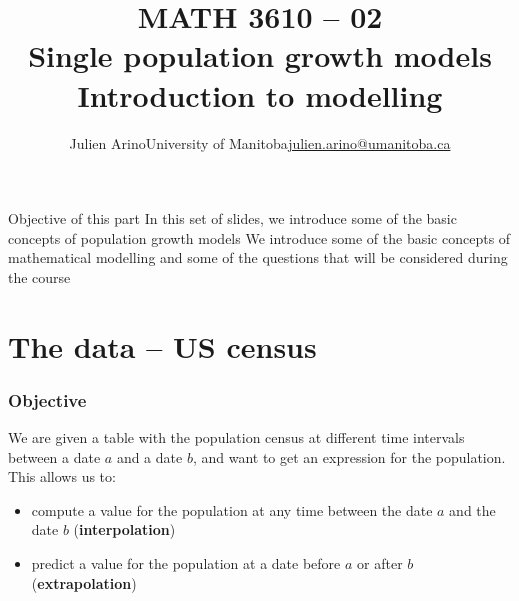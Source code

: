 \documentclass[aspectratio=169]{beamer}
\title[Single population growth]{MATH 3610 -- 02\\ Single population growth models\\Introduction to modelling}
\author{\texorpdfstring{Julien Arino\newline University of Manitoba\newline\url{julien.arino@umanitoba.ca}}{Julien Arino}}
\date{}
\begin{document}





\begin{frame}{Objective of this part}
In this set of slides, we introduce some of the basic concepts of population growth models
\vfill
We introduce some of the basic concepts of mathematical modelling and some of the questions that will be considered during the course
\end{frame}

\section{The data -- US census}



\begin{frame}\frametitle{Objective}
We are given a table with the population census at different time intervals between a date $a$ and a date $b$, and want to get an expression for the population. This allows us to: 
\vfill
\begin{itemize}
\item compute a value for the population at any time between the date $a$ and the date $b$ (\textbf{interpolation})
\vfill
\item predict a value for the population at a date before $a$ or after $b$ (\textbf{extrapolation})
\end{itemize}
\end{frame}
\end{document}
